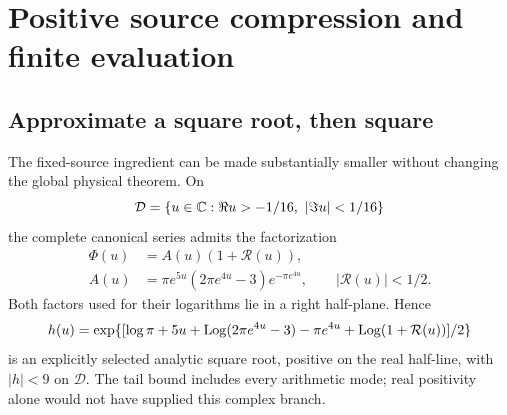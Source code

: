 \section{Positive source compression and finite evaluation}
\label{sec:effectivity}

\subsection{Approximate a square root, then square}
The fixed-source ingredient can be made substantially smaller without
changing the global physical theorem. On
\[
 \mathcal D=\{u\in\mathbb C:\Re u>-1/16,\ |\Im u|<1/16\}
\]
the complete canonical series admits the factorization
\begin{align*}
 \Phi(u)&=A(u)(1+\mathcal R(u)),\\
 A(u)&=\pi e^{5u}(2\pi e^{4u}-3)e^{-\pi e^{4u}},\qquad
 |\mathcal R(u)|<1/2.
\end{align*}
Both factors used for their logarithms lie in a right half-plane.
Hence
\begin{equation}
 h(u)=\exp\{[\log\pi+5u+\operatorname{Log}(2\pi e^{4u}-3)
                           -\pi e^{4u}+\operatorname{Log}(1+\mathcal R(u))]/2\}
 \label{eq:source-root}
\end{equation}
is an explicitly selected analytic square root, positive on the real
half-line, with $|h|<9$ on $\mathcal D$. The tail bound includes
every arithmetic mode; real positivity alone would not have supplied
this complex branch.

